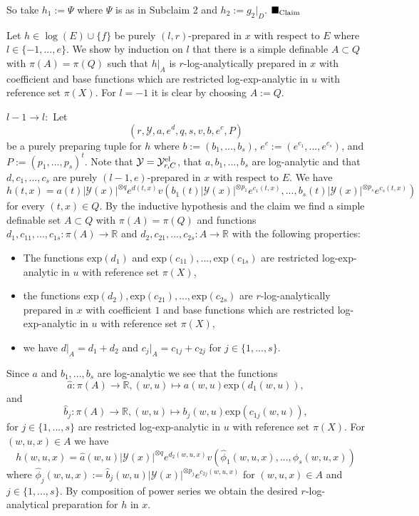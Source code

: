 \documentclass[12pt]{article}
\def\vs{\vspace}
\def\exp{\mathrm{exp}}
\begin{document}
\vs{0.4cm}
So take $h_1:=\Psi$ where $\Psi$ is as in Subclaim 2 and $h_2:=g_2|_D$. \hfill$\blacksquare_{\textnormal{Claim }}$

\vs{0.4cm}
Let $h \in \log(E) \cup \{f\}$ be purely $(l,r)$-prepared in $x$ with respect to $E$ where $l \in \{-1,...,e\}$. We show by induction on $l$ that there is a simple definable $A \subset Q$ with $\pi(A)=\pi(Q)$ such that $h|_A$ is $r$-log-analytically prepared in $x$ with coefficient and base functions which are restricted log-exp-analytic in $u$ with reference set $\pi(X)$. For $l=-1$ it is clear by choosing $A:=Q$. 

\vs{0.2cm}
$l-1 \to l:$ Let 
$$(r,\mathcal{Y},a,e^d,q,s,v,b,e^c,P)$$
be a purely preparing tuple for $h$ where $b:=(b_1,...,b_s)$, $e^c:=(e^{c_1},...,e^{c_s})$, and $P:=(p_1,...,p_s)^t$. Note that $\mathcal{Y}=\mathcal{Y}_{r,C}^{\textnormal{el}}$, that $a,b_1,...,b_s$ are log-analytic and that $d,c_1,...,c_s$ are purely $(l-1,e)$-prepared in $x$ with respect to $E$. We have
$$h(t,x)=a(t)\vert{\mathcal{Y}(x)}\vert^{\otimes q}e^{d(t,x)} v(b_1(t)\vert{\mathcal{Y}(x)}\vert^{\otimes p_1}e^{c_1(t,x)},...,b_s(t)\vert{\mathcal{Y}(x)}\vert^{\otimes p_s}e^{c_s(t,x)})$$
for every $(t,x) \in Q$. By the inductive hypothesis and the claim we find a simple definable set $A \subset Q$ with $\pi(A)=\pi(Q)$ and functions $d_1,c_{11},...,c_{1s}:\pi(A) \to \mathbb{R}$ and $d_2,c_{21},...,c_{2s}:A \to \mathbb{R}$ with the following properties: 

\begin{itemize}
	\item [(1)] The functions $\exp(d_1)$ and $\exp(c_{11}),...,\exp(c_{1s})$ are restricted log-exp-analytic in $u$ with reference set $\pi(X)$,
	\item [(2)] the functions $\exp(d_2),\exp(c_{21}),...,\exp(c_{2s})$ are $r$-log-analytically prepared in $x$ with coefficient $1$ and base functions which are restricted log-exp-analytic in $u$ with reference set $\pi(X)$,
	\item [(3)] we have $d|_A=d_1+d_2$ and $c_j|_A=c_{1j}+c_{2j}$ for $j \in \{1,...,s\}$.
\end{itemize}

Since $a$ and $b_1,...,b_s$ are log-analytic we see that the functions 
$$\hat{a}:\pi(A) \to \mathbb{R}, (w,u) \mapsto a(w,u) \exp(d_1(w,u)),$$
and
$$\hat{b}_j:\pi(A) \to \mathbb{R}, (w,u) \mapsto b_j(w,u) \exp(c_{1j}(w,u)),$$
for $j \in \{1,...,s\}$ are restricted log-exp-analytic in $u$ with reference set $\pi(X)$. For $(w,u,x) \in A$ we have 
$$h(w,u,x)=\hat{a}(w,u)\vert{\mathcal{Y}(x)}\vert^{\otimes q}e^{d_2(w,u,x)} v(\hat{\phi}_1(w,u,x),...,\hat{\phi}_s(w,u,x))$$
where $\hat{\phi}_j(w,u,x):=\hat{b}_j(w,u)\vert{\mathcal{Y}(x)}\vert^{\otimes p_j} e^{c_{2j}(w,u,x)}$ for $(w,u,x) \in A$ and $j \in \{1,...,s\}$. By composition of power series we obtain the desired $r$-log-analytical preparation for $h$ in $x$.  
\end{document}
